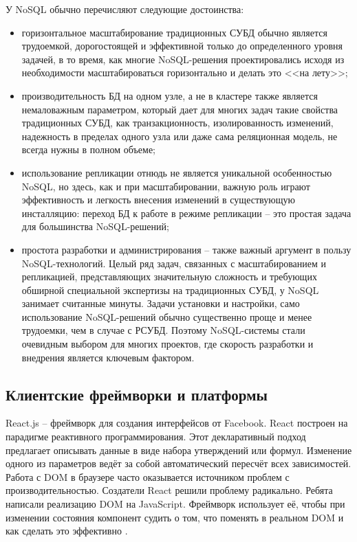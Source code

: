 У NoSQL обычно перечисляют следующие достоинства:
\begin{itemize}
  \item горизонтальное масштабирование традиционных СУБД обычно является трудоемкой, дорогостоящей и эффективной только до определенного уровня задачей, в то время, как многие NoSQL-решения проектировались исходя из необходимости масштабироваться горизонтально и делать это <<на лету>>;
  \item производительность БД на одном узле, а не в кластере также является немаловажным параметром, который дает для многих задач такие свойства традиционных СУБД, как транзакционность, изолированность изменений, надежность в пределах одного узла или даже сама реляционная модель, не всегда нужны в полном объеме;
  \item использование репликации отнюдь не является уникальной особенностью NoSQL, но здесь, как и при масштабировании, важную роль играют эффективность и легкость внесения изменений в существующую инсталляцию: переход БД к работе в режиме репликации -- это простая задача для большинства NoSQL-решений;
  \item простота разработки и администрирования -- также важный аргумент в пользу NoSQL-технологий. Целый ряд задач, связанных с масштабированием и репликацией, представляющих значительную сложность и требующих обширной специальной экспертизы на традиционных СУБД, у NoSQL занимает считанные минуты. Задачи установки и настройки, само использование NoSQL-решений обычно существенно проще и менее трудоемки, чем в случае с РСУБД. Поэтому NoSQL-системы стали очевидным выбором для многих проектов, где скорость разработки и внедрения является ключевым фактором.
\end{itemize}


\subsection{Клиентские фреймворки и платформы}
\label{sub:domain:other_algos}
React.js -- фреймворк для создания интерфейсов от Facebook. React построен на парадигме реактивного программирования. Этот декларативный подход предлагает описывать данные в виде набора утверждений или формул. Изменение одного из параметров ведёт за собой автоматический пересчёт всех зависимостей. Работа с DOM в браузере часто оказывается источником проблем с производительностью. Создатели React решили проблему радикально. Ребята написали реализацию DOM на JavaScript. Фреймворк использует её, чтобы при изменении состояния компонент судить о том, что поменять в реальном DOM и как сделать это эффективно \cite{react_js}.

